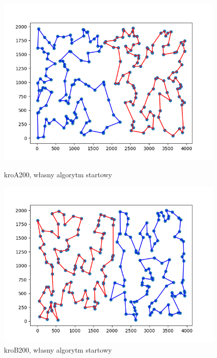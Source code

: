 \documentclass[11pt]{article}
\begin{document}
\begin{figure}[H]
    \vspace{0.5cm}

    \begin{minipage}[t]{0.45\textwidth}
        \centering
        \includegraphics[width=\linewidth]{best_paths/kroA200/traverse_steepest_both/split_paths_regret_TSP}
        \caption{kroA200, własny algorytm startowy}
    \end{minipage}
    \hfill
    \begin{minipage}[t]{0.45\textwidth}
        \centering
        \includegraphics[width=\linewidth]{best_paths/kroB200/traverse_steepest_both/split_paths_regret_TSP}
        \caption{kroB200, własny algorytm startowy}
    \end{minipage}
    \label{fig:minipage-steepest-both}
\end{figure}
\end{document}

